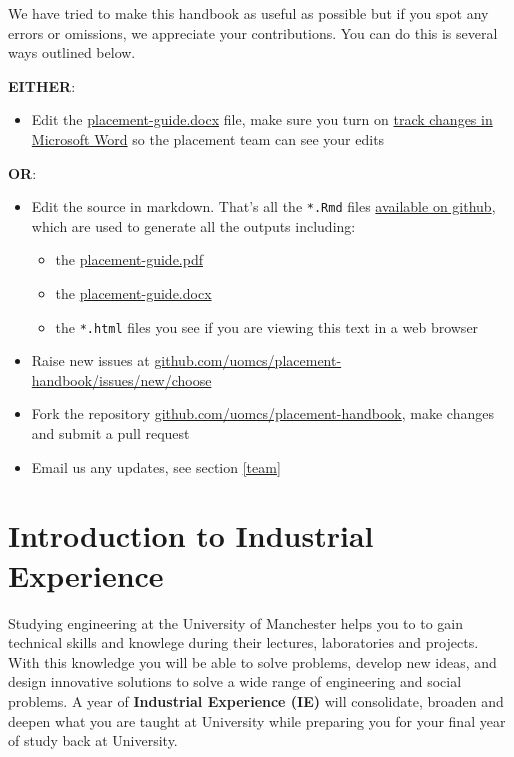 \documentclass[
]{book}
\providecommand{\tightlist}{%
  \setlength{\itemsep}{0pt}\setlength{\parskip}{0pt}}
\begin{document}
We have tried to make this handbook as useful as possible but if you spot any errors or omissions, we appreciate your contributions. You can do this is several ways outlined below.

\textbf{EITHER}:

\begin{itemize}
\tightlist
\item
  Edit the \url{placement-guide.docx} file, make sure you turn on \href{https://support.microsoft.com/en-gb/office/track-changes-in-word-197ba630-0f5f-4a8e-9a77-3712475e806a}{track changes in Microsoft Word} so the placement team can see your edits
\end{itemize}

\textbf{OR}:

\begin{itemize}
\tightlist
\item
  Edit the source in markdown. That's all the \texttt{*.Rmd} files \href{https://github.com/search?q=repo\%3AUoMCS\%2Fplacement-handbook++language\%3ARMarkdown&type=code}{available on github}, which are used to generate all the outputs including:

  \begin{itemize}
  \tightlist
  \item
    the \url{placement-guide.pdf}
  \item
    the \url{placement-guide.docx}
  \item
    the \texttt{*.html} files you see if you are viewing this text in a web browser
  \end{itemize}
\item
  Raise new issues at \href{https://github.com/uomcs/placement-handbook/issues/new/choose}{github.com/uomcs/placement-handbook/issues/new/choose}
\item
  Fork the repository \href{https://github.com/uomcs/placement-handbook}{github.com/uomcs/placement-handbook}, make changes and submit a pull request
\item
  Email us any updates, see section \ref{team}
\end{itemize}

\chapter{Introduction to Industrial Experience}\label{intro}

Studying engineering at the University of Manchester helps you to to gain technical skills and knowlege during their lectures, laboratories and projects. With this knowledge you will be able to solve problems, develop new ideas, and design innovative solutions to solve a wide range of engineering and social problems. A year of \textbf{Industrial Experience (IE)} will consolidate, broaden and deepen what you are taught at University while preparing you for your final year of study back at University.
\end{document}
